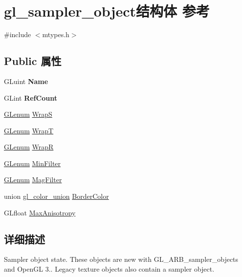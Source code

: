 \hypertarget{structgl__sampler__object}{}\section{gl\+\_\+sampler\+\_\+object结构体 参考}
\label{structgl__sampler__object}


{\ttfamily \#include $<$mtypes.\+h$>$}

\subsection*{Public 属性}
\begin{DoxyCompactItemize}
\item 
\mbox{\label{structgl__sampler__object_aa96673f7ccf4f8d276d63784709edb90}} 
G\+Luint {\bfseries Name}
\item 
\mbox{\label{structgl__sampler__object_acfaf8bfcf4552cc020264308e6952a49}} 
G\+Lint {\bfseries Ref\+Count}
\item 
\hyperlink{interfacevoid}{G\+Lenum} \hyperlink{structgl__sampler__object_a98710e17dd1a1903537469054ecb556e}{WrapS}
\item 
\hyperlink{interfacevoid}{G\+Lenum} \hyperlink{structgl__sampler__object_a96c3ba2023e6d85d7fce3953b8a9b4e8}{WrapT}
\item 
\hyperlink{interfacevoid}{G\+Lenum} \hyperlink{structgl__sampler__object_ac31491fd29fabc1a54e423a42d9e1580}{WrapR}
\item 
\hyperlink{interfacevoid}{G\+Lenum} \hyperlink{structgl__sampler__object_a3c84fc28aeef723fbfc0913512d0b625}{Min\+Filter}
\item 
\hyperlink{interfacevoid}{G\+Lenum} \hyperlink{structgl__sampler__object_a18363b04379a6caeac6d0099428eaf27}{Mag\+Filter}
\item 
union \hyperlink{uniongl__color__union}{gl\+\_\+color\+\_\+union} \hyperlink{structgl__sampler__object_afeba762863c20c06392a802054cfb981}{Border\+Color}
\item 
G\+Lfloat \hyperlink{structgl__sampler__object_a46ca8b099839d38a6753b282c0c0b97e}{Max\+Anisotropy}
\end{DoxyCompactItemize}


\subsection{详细描述}
Sampler object state. These objects are new with G\+L\+\_\+\+A\+R\+B\+\_\+sampler\+\_\+objects and Open\+GL 3.. Legacy texture objects also contain a sampler object. 

